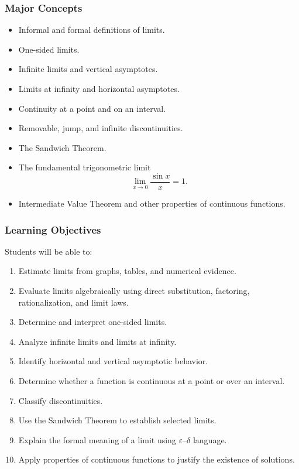 \documentclass[11pt]{article}
\begin{document}
\subsubsection{Major Concepts}

\begin{itemize}
    \item Informal and formal definitions of limits.
    \item One-sided limits.
    \item Infinite limits and vertical asymptotes.
    \item Limits at infinity and horizontal asymptotes.
    \item Continuity at a point and on an interval.
    \item Removable, jump, and infinite discontinuities.
    \item The Sandwich Theorem.
    \item The fundamental trigonometric limit
    \[
        \lim_{x \to 0}\frac{\sin x}{x} = 1.
    \]
    \item Intermediate Value Theorem and other properties of continuous functions.
\end{itemize}

\subsubsection{Learning Objectives}

Students will be able to:

\begin{enumerate}
    \item Estimate limits from graphs, tables, and numerical evidence.
    \item Evaluate limits algebraically using direct substitution, factoring, rationalization, and limit laws.
    \item Determine and interpret one-sided limits.
    \item Analyze infinite limits and limits at infinity.
    \item Identify horizontal and vertical asymptotic behavior.
    \item Determine whether a function is continuous at a point or over an interval.
    \item Classify discontinuities.
    \item Use the Sandwich Theorem to establish selected limits.
    \item Explain the formal meaning of a limit using $\varepsilon$--$\delta$ language.
    \item Apply properties of continuous functions to justify the existence of solutions.
\end{enumerate}
\end{document}
